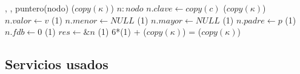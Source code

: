 {   ,
    ,
    }
{puntero(nodo)}
{\bigo($copy(\kappa)$)}
{   \var $n : nodo$
    \State $n.clave \gets copy(c)$              \comment \bigo($copy(\kappa)$)
    \State $n.valor \gets v$                    \comment \bigo(1)
    \State $n.menor \gets NULL$                 \comment \bigo(1)
    \State $n.mayor \gets NULL$                 \comment \bigo(1)
    \State $n.padre \gets p$                    \comment \bigo(1)
    \State $n.fdb \gets 0$                      \comment \bigo(1)
    \State $res \gets \&n$                      \comment \bigo(1)
}
{   6*\bigo(1) + \bigo($copy(\kappa)$) = \bigo($copy(\kappa)$) }

    
\subsection{Servicios usados}


